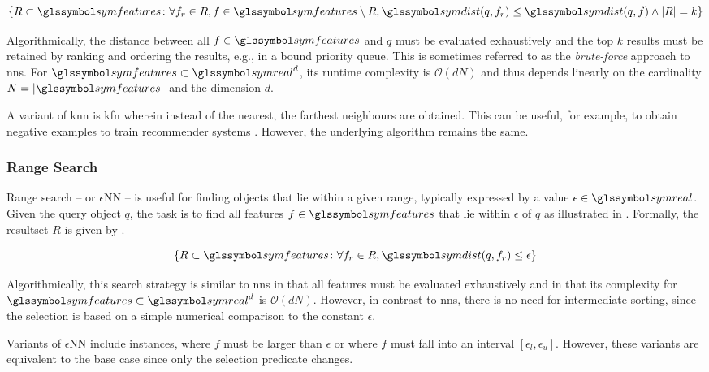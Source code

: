 \begin{equation}
    \label{eq:knn}
    \lbrace R \subset \symfeatures \colon \forall f_r \in R, f \in \symfeatures \setminus R, \symdist(q,f_r) \leq \symdist(q,f) \wedge |R| = k \rbrace
\end{equation}

Algorithmically, the distance between all $f \in \symfeatures$ and $q$ must be evaluated exhaustively and the top $k$ results must be retained by ranking and ordering the results, e.g., in a bound priority queue. This is sometimes referred to as the \emph{brute-force} approach to \acrshort{nns}. For $\symfeatures \subset \symreal^d$, its runtime complexity is $\mathcal{O}(dN)$ and thus depends linearly on the cardinality $N = |\symfeatures|$ and the dimension $d$. 

A variant of \acrshort{knn} is \acrfull{kfn} wherein instead of the nearest, the farthest neighbours are obtained. This can be useful, for example, to obtain negative examples to train recommender systems \cite{Pagh:2015Approximate}. However, the underlying algorithm remains the same.

\subsubsection{Range Search}

Range search -- or $\epsilon$NN -- is useful for finding objects that lie within a given range, typically expressed by a value $\epsilon \in \symreal$. Given the query object $q$, the task is to find all features $f \in \symfeatures$ that lie within $\epsilon$ of $q$ as illustrated in . Formally, the resultset $R$ is given by .

\begin{equation}
    \label{eq:epsilonnn}
    \lbrace R \subset \symfeatures \colon \forall f_r \in R, \symdist(q,f_r) \leq \epsilon \rbrace
\end{equation}

Algorithmically, this search strategy is similar to \acrshort{nns} in that all features must be evaluated exhaustively and in that its complexity for $\symfeatures \subset \symreal^d$ is $\mathcal{O}(dN)$. However, in contrast to \acrshort{nns}, there is no need for intermediate sorting, since the selection is based on a simple numerical comparison to the constant $\epsilon$.

Variants of $\epsilon$NN include instances, where $f$ must be larger than $\epsilon$ or where $f$ must fall into an interval $[ \epsilon_{l}, \epsilon_{u} ]$. However, these variants are equivalent to the base case since only the selection predicate changes.

